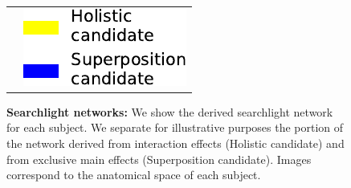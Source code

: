 \begin{figure}[ht]
\begin{tabular}{cc}
&{\includegraphics[width=.3\linewidth]{figures/part_II/searchlight-regions_legend.pdf}}
\hspace{-1ex} \\
\end{tabular}
\vspace{3ex}
\caption{\textbf{Searchlight networks:} We show the derived searchlight network for each subject. We separate for illustrative purposes the portion of the network derived from interaction effects (Holistic candidate) and from exclusive main effects (Superposition candidate). Images correspond to the anatomical space of each subject.}
\label{fig:searchlight_regions}
\end{figure}
